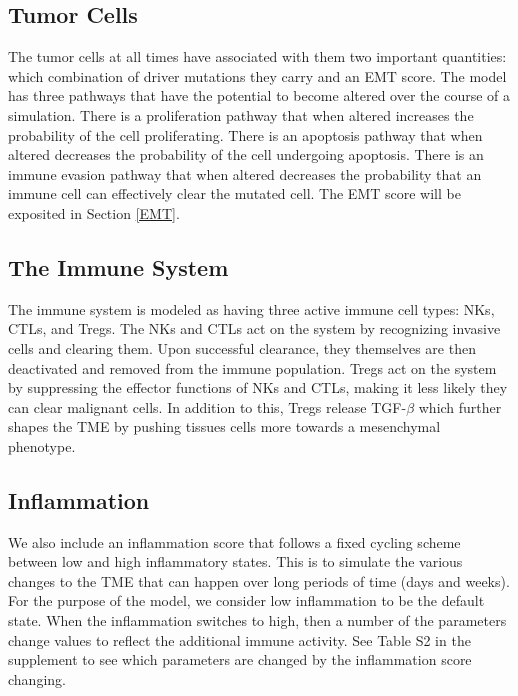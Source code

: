 \documentclass[11pt]{article}
\begin{document}
\subsection{Tumor Cells}\label{TissueCells}
The tumor cells at all times have associated with them two important quantities: which combination of driver mutations they carry and an EMT score.
The model has three pathways that have the potential to become altered over the course of a simulation.
There is a proliferation pathway that when altered increases the probability of the cell proliferating.
There is an apoptosis pathway that when altered decreases the probability of the cell undergoing apoptosis.
There is an immune evasion pathway that when altered decreases the probability that an immune cell can effectively clear the mutated cell.
The EMT score will be exposited in Section \ref{EMT}. 

\subsection{The Immune System}\label{ImmuneSystem}
The immune system is modeled as having three active immune cell types: NKs, CTLs, and Tregs.
The NKs and CTLs act on the system by recognizing invasive cells and clearing them.
Upon successful clearance, they themselves are then deactivated and removed from the immune population.
Tregs act on the system by suppressing the effector functions of NKs and CTLs, making it less likely they can clear malignant cells.
In addition to this, Tregs release TGF-$\beta$ which further shapes the TME by pushing tissues cells more towards a mesenchymal phenotype.

\subsection{Inflammation} 
We also include an inflammation score that follows a fixed cycling scheme between low and high inflammatory states.
This is to simulate the various changes to the TME that can happen over long periods of time (days and weeks).
For the purpose of the model, we consider low inflammation to be the default state.
When the inflammation switches to high, then a number of the parameters change values to reflect the additional immune activity.
See Table S2 in the supplement to see which parameters are changed by the inflammation score changing.
\end{document}
